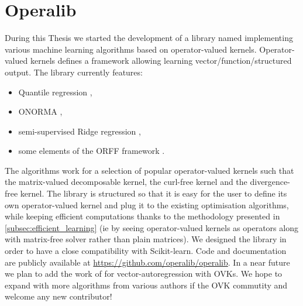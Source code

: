 \section{Operalib}
During this Thesis we started the development of a library named 
implementing various machine learning algorithms based on operator-valued
kernels. Operator-valued kernels defines a framework allowing learning
vector/function/structured output. The library currently features:
\begin{itemize}
    \item Quantile regression \citep{sangnier2016joint},
    \item \acs{ONORMA} \citep{audiffren2013online},
    \item semi-supervised Ridge regression \citep{Brouard2016_jmlr},
    \item some elements of the \acs{ORFF} framework \citep{brault2016random}.
\end{itemize}
The algorithms work for a selection of popular operator-valued kernels such
that the matrix-valued decomposable kernel, the curl-free kernel and the
divergence-free kernel. The library is structured so that it is easy for the
user to define its own operator-valued kernel and plug it to the existing
optimisation algorithms, while keeping efficient computations thanks to the
methodology presented in \cref{subsec:efficient_learning} (\acs{ie} by seeing
operator-valued kernels as operators along with matrix-free solver rather than
plain matrices). We designed the library in order to have a close compatibility
with Scikit-learn. Code and documentation are publicly available at
\url{https://github.com/operalib/operalib}. In a near future we plan to add the
work of \citet{lim2015operator} for vector-autoregression with \acsp{OVK}. We
hope to expand with more algorithms from various authors if the \acs{OVK}
commutity and welcome any new contributor!

\chapterend
